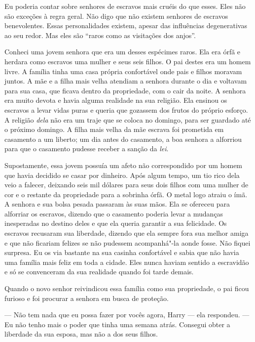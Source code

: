 Eu poderia contar sobre senhores de
escravos mais cruéis do que esses. Eles não são exceções à regra geral.
Não digo que não existem senhores de escravos benevolentes. Essas
personalidades existem, apesar das influências degenerativas ao seu
redor. Mas eles são ``raros como as visitações dos anjos''.

Conheci uma jovem senhora que era um
desses espécimes raros. Ela era órfã e herdara como escravos uma mulher
e seus seis filhos. O pai destes era um homem livre. A família tinha uma
casa própria confortável onde pais e filhos moravam juntos. A mãe e a
filha mais velha atendiam a senhora durante o dia e voltavam para sua
casa, que ficava dentro da propriedade, com o cair da noite. A senhora
era muito devota e havia alguma realidade na sua religião. Ela ensinou
os escravos a levar vidas puras e queria que gozassem dos frutos do
próprio esforço. A religião \emph{dela} não era um traje que se coloca
no domingo, para ser guardado até o próximo domingo. A filha mais velha
da mãe escrava foi prometida em casamento a um liberto; um dia antes do
casamento, a boa senhora a alforriou para que o casamento pudesse
receber a sanção da \emph{lei}.

Supostamente, essa jovem possuía um
afeto não correspondido por um homem que havia decidido se casar por
dinheiro. Após algum tempo, um tio rico dela veio a falecer, deixando
seis mil dólares para seus dois filhos com uma mulher de cor e o
restante da propriedade para a sobrinha órfã. O metal logo atraiu o ímã.
A senhora e sua bolsa pesada passaram às suas mãos. Ela se ofereceu para
alforriar os escravos, dizendo que o casamento poderia levar a mudanças
inesperadas no destino deles e que ela queria garantir a sua felicidade.
Os escravos recusaram sua liberdade, dizendo que ela sempre fora sua
melhor amiga e que não ficariam felizes se não pudessem acompanhá"-la
aonde fosse. Não fiquei surpresa. Eu os via bastante na sua casinha
confortável e sabia que não havia uma família mais feliz em toda a
cidade. Eles nunca haviam sentido a escravidão e só se convenceram da
sua realidade quando foi tarde demais.

Quando o novo senhor reivindicou essa
família como sua propriedade, o pai ficou furioso e foi procurar a
senhora em busca de proteção.

--- Não tem nada que eu possa fazer por vocês agora, Harry --- ela
respondeu. --- Eu não tenho mais o poder que tinha uma semana atrás.
Consegui obter a liberdade da sua esposa, mas não a dos seus filhos.

